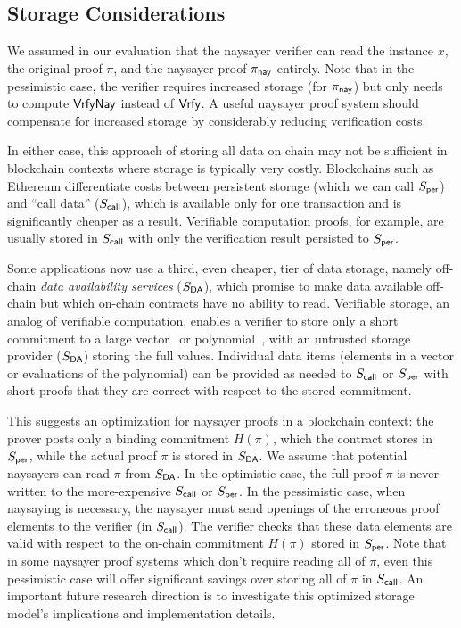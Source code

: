 \subsection{Storage Considerations}\label{sec:storage}

We assumed in our evaluation that the naysayer verifier can read the instance $x$, the original proof $\pi$, and the naysayer proof $\pi_{\mathsf{nay}}$ entirely. Note that in the pessimistic case, the verifier requires increased storage (for $\pi_{\mathsf{nay}}$) but only needs to compute ${\mathsf{Vrfy}}\mathsf{Nay}$ instead of $\mathsf{Vrfy}$. A useful naysayer proof system should compensate for increased storage by considerably reducing verification costs.

In either case, this approach of storing all data on chain may not be sufficient in blockchain contexts where storage is typically very costly. 
Blockchains such as Ethereum differentiate costs between persistent storage (which we can call $S_{\sf per}$) and ``call data'' ($S_{\sf call}$), which is available only for one transaction and is significantly cheaper as a result. Verifiable computation proofs, for example, are usually stored in $S_{\sf call}$ with only the verification result persisted to $S_{\sf per}$.

Some applications now use a third, even cheaper, tier of data storage, namely off-chain \emph{data availability services} ($S_{\sf DA}$), which promise to make data available off-chain but which on-chain contracts have no ability to read. Verifiable storage, an analog of verifiable computation, enables a verifier to store only a short commitment to a large vector~\cite{PKC:CatFio13,C:Merkle87} or polynomial~\cite{AC:KatZavGol10}, with an untrusted storage provider ($S_{\sf DA}$) storing the full values. Individual data items (elements in a vector or evaluations of the polynomial) can be provided as needed to $S_{\sf call}$ or $S_{\sf per}$ with short proofs that they are correct with respect to the stored commitment.

This suggests an optimization for naysayer proofs in a blockchain context: the prover posts only a binding commitment $H(\pi)$, which the contract stores in $S_{\sf per}$, while the actual proof $\pi$ is stored in $S_{\sf DA}$. We assume that potential naysayer{}s can read $\pi$ from $S_{\sf DA}$. In the optimistic case, the full proof $\pi$ is never written to the more-expensive $S_{\sf call}$ or $S_{\sf per}$. In the pessimistic case, when naysaying is necessary, the naysayer must send openings of the erroneous proof elements to the verifier (in $S_{\sf call}$). The verifier checks that these data elements are valid with respect to the on-chain commitment $H(\pi)$ stored in $S_{\sf per}$. Note that in some naysayer proof systems which don't require reading all of $\pi$, even this pessimistic case will offer significant savings over storing all of $\pi$ in $S_{\sf call}$. An important future research direction is to investigate this optimized storage model's implications and implementation details.

